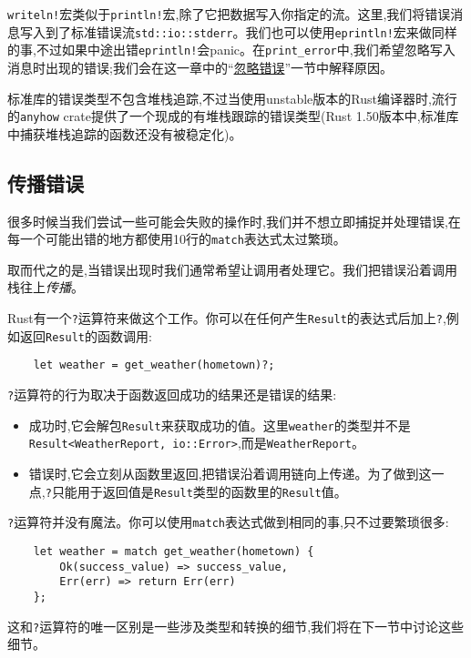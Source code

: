 \texttt{writeln!}宏类似于\texttt{println!}宏,除了它把数据写入你指定的流。这里,我们将错误消息写入到了标准错误流\texttt{std::io::stderr}。我们也可以使用\texttt{eprintln!}宏来做同样的事,不过如果中途出错\texttt{eprintln!}会panic。在\texttt{print\_error}中,我们希望忽略写入消息时出现的错误;我们会在这一章中的“\hyperref[ignoreerr]{忽略错误}”一节中解释原因。

标准库的错误类型不包含堆栈追踪,不过当使用unstable版本的Rust编译器时,流行的\texttt{anyhow} crate提供了一个现成的有堆栈跟踪的错误类型(Rust 1.50版本中,标准库中捕获堆栈追踪的函数还没有被稳定化)。

\subsection{传播错误}\label{properror}
很多时候当我们尝试一些可能会失败的操作时,我们并不想立即捕捉并处理错误,在每一个可能出错的地方都使用10行的\texttt{match}表达式太过繁琐。

取而代之的是,当错误出现时我们通常希望让调用者处理它。我们把错误沿着调用栈往上\emph{传播}。

Rust有一个\texttt{?}运算符来做这个工作。你可以在任何产生\texttt{Result}的表达式后加上\texttt{?},例如返回\texttt{Result}的函数调用:
\begin{verbatim}
    let weather = get_weather(hometown)?;
\end{verbatim}

\texttt{?}运算符的行为取决于函数返回成功的结果还是错误的结果:
\begin{itemize}
    \item 成功时,它会解包\texttt{Result}来获取成功的值。这里\texttt{weather}的类型并不是\\
    \texttt{Result<WeatherReport, io::Error>},而是\texttt{WeatherReport}。
    \item 错误时,它会立刻从函数里返回,把错误沿着调用链向上传递。为了做到这一点,\texttt{?}只能用于返回值是\texttt{Result}类型的函数里的\texttt{Result}值。
\end{itemize}

\texttt{?}运算符并没有魔法。你可以使用\texttt{match}表达式做到相同的事,只不过要繁琐很多:
\begin{verbatim}
    let weather = match get_weather(hometown) {
        Ok(success_value) => success_value,
        Err(err) => return Err(err)
    };
\end{verbatim}

这和\texttt{?}运算符的唯一区别是一些涉及类型和转换的细节,我们将在下一节中讨论这些细节。

